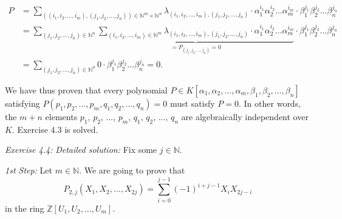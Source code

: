 \documentclass[numbers=enddot,12pt,final,onecolumn,notitlepage]{scrartcl}%
\begin{document}
\begin{align*}
P  &  =\sum\limits_{\left(  \left(  i_{1},i_{2},...,i_{m}\right)  ,\left(
j_{1},j_{2},...,j_{n}\right)  \right)  \in\mathbb{N}^{m}\times\mathbb{N}^{n}%
}\lambda_{\left(  i_{1},i_{2},...,i_{m}\right)  ,\left(  j_{1},j_{2}%
,...,j_{n}\right)  }\cdot\alpha_{1}^{i_{1}}\alpha_{2}^{i_{2}}...\alpha
_{m}^{i_{m}}\cdot\beta_{1}^{j_{1}}\beta_{2}^{j_{2}}...\beta_{n}^{j_{n}}\\
&  =\sum\limits_{\left(  j_{1},j_{2},...,j_{n}\right)  \in\mathbb{N}^{n}%
}\underbrace{\sum\limits_{\left(  i_{1},i_{2},...,i_{m}\right)  \in
\mathbb{N}^{m}}\lambda_{\left(  i_{1},i_{2},...,i_{m}\right)  ,\left(
j_{1},j_{2},...,j_{n}\right)  }\cdot\alpha_{1}^{i_{1}}\alpha_{2}^{i_{2}%
}...\alpha_{m}^{i_{m}}}_{=P_{\left(  j_{1},j_{2},...,j_{n}\right)  }=0}%
\cdot\beta_{1}^{j_{1}}\beta_{2}^{j_{2}}...\beta_{n}^{j_{n}}\\
&  =\sum\limits_{\left(  j_{1},j_{2},...,j_{n}\right)  \in\mathbb{N}^{n}%
}0\cdot\beta_{1}^{j_{1}}\beta_{2}^{j_{2}}...\beta_{n}^{j_{n}}=0.
\end{align*}


We have thus proven that every polynomial $P\in K\left[  \alpha_{1},\alpha
_{2},...,\alpha_{m},\beta_{1},\beta_{2},...,\beta_{n}\right]  $ satisfying
$P\left(  p_{1},p_{2},...,p_{m},q_{1},q_{2},...,q_{n}\right)  =0$ must satisfy
$P=0$. In other words, the $m+n$ elements $p_{1}$, $p_{2}$, $...$, $p_{m}$,
$q_{1}$, $q_{2}$, $...$, $q_{n}$ are algebraically independent over $K$.
Exercise 4.3 is solved.

\textit{Exercise 4.4:} \textit{Detailed solution:} Fix some $j\in\mathbb{N}$.

\textit{1st Step:} Let $m\in\mathbb{N}$. We are going to prove that%
\[
P_{2,j}\left(  X_{1},X_{2},...,X_{2j}\right)  =\sum\limits_{i=0}^{j-1}\left(
-1\right)  ^{i+j-1}X_{i}X_{2j-i}%
\]
in the ring $\mathbb{Z}\left[  U_{1},U_{2},...,U_{m}\right]  $.
\end{document}
